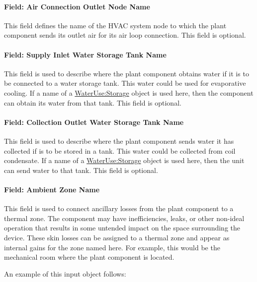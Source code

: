 \paragraph{Field: Air Connection Outlet Node Name}\label{field-air-connection-outlet-node-name}

This field defines the name of the HVAC system node to which the plant component sends its outlet air for its air loop connection. This field is optional.

\paragraph{Field: Supply Inlet Water Storage Tank Name}\label{field-supply-inlet-water-storage-tank-name-3}

This field is used to describe where the plant component obtains water if it is to be connected to a water storage tank. This water could be used for evaporative cooling. If a name of a \hyperref[waterusestorage]{WaterUse:Storage} object is used here, then the component can obtain its water from that tank. This field is optional.

\paragraph{Field: Collection Outlet Water Storage Tank Name}\label{field-collection-outlet-water-storage-tank-name-3}

This field is used to describe where the plant component sends water it has collected if is to be stored in a tank. This water could be collected from coil condensate. If a name of a \hyperref[waterusestorage]{WaterUse:Storage} object is used here, then the unit can send water to that tank. This field is optional.

\paragraph{Field: Ambient Zone Name}\label{field-ambient-zone-name-3}

This field is used to connect ancillary losses from the plant component to a thermal zone. The component may have inefficiencies, leaks, or other non-ideal operation that results in some untended impact on the space surrounding the device. These skin losses can be assigned to a thermal zone and appear as internal gains for the zone named here. For example, this would be the mechanical room where the plant component is located.

An example of this input object follows:

